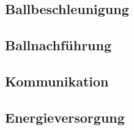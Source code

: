 \subsection{Ballbeschleunigung}





\subsection{Ballnachführung}


\subsection{Kommunikation}


\subsection{Energieversorgung}
%
